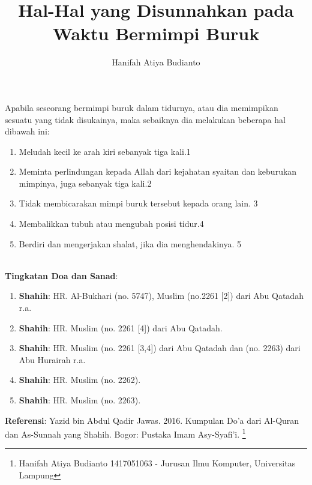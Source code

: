 \documentclass[a4paper,12pt]{article}
\title{\Large Hal-Hal yang Disunnahkan pada Waktu Bermimpi Buruk}
\author{\calligra Hanifah Atiya Budianto}
\begin{document}
\sffamily
\maketitle 
\fullvocalize
{}
\par
\indent
Apabila seseorang bermimpi buruk dalam tidurnya, atau dia memimpikan 
sesuatu yang tidak disukainya, maka sebaiknya dia melakukan beberapa hal 
dibawah ini:
\begin{enumerate}
\item Meludah kecil ke arah kiri sebanyak tiga kali.{\scriptsize 1}
\item Meminta perlindungan kepada Allah dari kejahatan syaitan dan
keburukan mimpinya, juga sebanyak tiga kali.{\scriptsize 2}
\item Tidak membicarakan mimpi buruk tersebut kepada orang lain.
{\scriptsize 3}
\item Membalikkan tubuh atau mengubah posisi tidur.{\scriptsize 4}
\item Berdiri dan mengerjakan shalat, jika dia menghendakinya.
{\scriptsize 5}\\\\
\end{enumerate}
\par
\noindent
\textbf{Tingkatan Doa dan Sanad}: 
\begin{enumerate}
\item \textbf{Shahih}: HR. Al-Bukhari (no. 5747), Muslim (no.2261 [2]) dari
Abu Qatadah r.a.
\item \textbf{Shahih}: HR. Muslim (no. 2261 [4]) dari Abu Qatadah.
\item \textbf{Shahih}: HR. Muslim (no. 2261 [3,4]) dari Abu Qatadah dan
(no. 2263) dari Abu Hurairah r.a.
\item \textbf{Shahih}: HR. Muslim (no. 2262).
\item \textbf{Shahih}: HR. Muslim (no. 2263).
\end{enumerate}
\textbf{Referensi}: Yazid bin Abdul Qadir Jawas. 2016. Kumpulan Do'a dari
Al-Quran dan As-Sunnah yang Shahih. Bogor: Pustaka Imam Asy-Syafi'i.
\footnote{Hanifah Atiya Budianto 1417051063 - Jurusan Ilmu Komputer,
Universitas Lampung}
\end{document}
